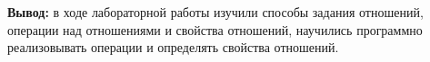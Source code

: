\documentclass[a4paper,14pt]{extarticle}
\begin{document}
\begin{enumerate}[label=2.\arabic*.]
\end{enumerate}

\textbf{Вывод: } в ходе лабораторной работы изучили способы задания отношений, операции над отношениями и свойства отношений, научились программно реализовывать операции и определять свойства отношений.
\end{document}
